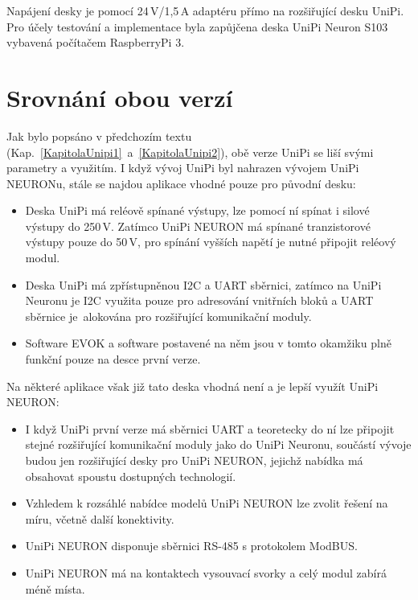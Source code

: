 Napájení desky je pomocí 24\,V/1,5\,A adaptéru přímo na rozšiřující desku UniPi. Pro účely testování a implementace byla zapůjčena deska UniPi Neuron S103 vybavená počítačem RaspberryPi 3.



\section{Srovnání obou verzí}

Jak bylo popsáno v předchozím textu (Kap.~\ref{KapitolaUnipi1}~a~\ref{KapitolaUnipi2}), obě verze UniPi se liší svými parametry a využitím. I když vývoj UniPi byl nahrazen vývojem UniPi NEURONu, stále se najdou aplikace vhodné pouze pro původní desku:


\begin{itemize}
	\item Deska UniPi má reléově spínané výstupy, lze pomocí ní spínat i silové výstupy do 250\,V. Zatímco UniPi NEURON má spínané tranzistorové výstupy pouze do 50\,V, pro spínání vyšších napětí je nutné připojit reléový modul.
	\item Deska UniPi má zpřístupněnou I2C a UART sběrnici, zatímco na UniPi Neuronu je I2C využita pouze pro adresování vnitřních bloků a UART sběrnice je~alokována pro rozšiřující komunikační moduly.
	\item Software EVOK a software postavené na něm jsou v tomto okamžiku plně funkční pouze na desce první verze.	
\end{itemize}

\vspace{10pt}
Na některé aplikace však již tato deska vhodná není a je lepší využít UniPi NEURON:

\begin{itemize}
	\item I když UniPi první verze má sběrnici UART a teoretecky do ní lze připojit stejné rozšiřující komunikační moduly jako do UniPi Neuronu, součástí vývoje budou jen rozšiřující desky pro UniPi NEURON, jejichž nabídka má obsahovat spoustu dostupných technologií.
	\item Vzhledem k rozsáhlé nabídce modelů UniPi NEURON lze zvolit řešení na míru, včetně další konektivity.
	\item UniPi NEURON disponuje sběrnici RS-485 s protokolem ModBUS.
	\item UniPi NEURON má na kontaktech vysouvací svorky a celý modul zabírá méně místa.	
\end{itemize}

